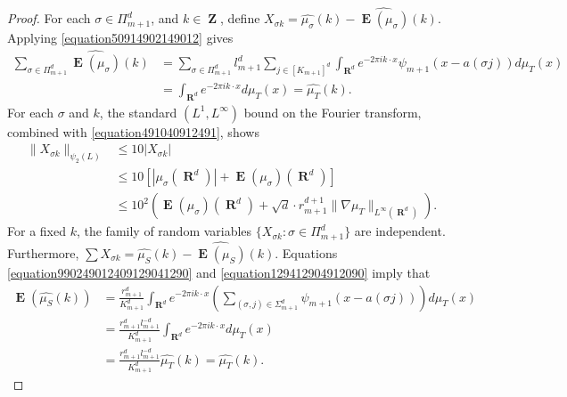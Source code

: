\documentclass[12pt,reqno]{article}
\numberwithin{equation}{section}
\DeclareMathOperator{\RR}{\mathbf{R}}
\DeclareMathOperator{\ZZ}{\mathbf{Z}}
\DeclareMathOperator{\EE}{\mathbf{E}}
\newcommand{\psitwo}[1]{\| {#1} \|_{\psi_2(L)}}
\begin{document}
\begin{proof}
    For each $\sigma \in \Pi_{m+1}^d$, and $k \in \ZZ$, define $X_{\sigma k} = \widehat{\mu_\sigma}(k) - \widehat{\EE(\mu_\sigma)}(k)$. Applying \eqref{equation50914902149012} gives 
    \begin{equation} \label{equation891248921894128942189}
    \begin{split}
        \sum_{\sigma \in \Pi_{m+1}^d} \widehat{\EE(\mu_\sigma)}(k) &= \sum_{\sigma \in \Pi_{m+1}^d} l_{m+1}^d \sum_{j \in [K_{m+1}]^d} \int_{\RR^d} e^{- 2 \pi i k \cdot x} \psi_{m+1}(x - a(\sigma j)) d\mu_T(x)\\
        &= \int_{\RR^d} e^{-2 \pi i k \cdot x} d\mu_T(x) = \widehat{\mu_T}(k).
    \end{split}
    \end{equation}
    For each $\sigma$ and $k$, the standard $(L^1,L^\infty)$ bound on the Fourier transform, combined with \eqref{equation491040912491}, shows
    \begin{equation} \label{equation12904912049012}
    \begin{split}
        \psitwo{X_{\sigma k}} &\leq 10 | X_{\sigma k} |\\
        &\leq 10[| \mu_\sigma(\RR^d) | + \EE(\mu_\sigma)(\RR^d)]\\
        &\leq 10^2 \left( \EE(\mu_\sigma)(\RR^d) + \sqrt{d} \cdot r_{m+1}^{d+1} \| \nabla \mu_T \|_{L^\infty(\RR^d)} \right).
    \end{split}
    \end{equation}
    For a fixed $k$, the family of random variables $\{ X_{\sigma k} : \sigma \in \Pi_{m+1}^d \}$ are independent. Furthermore, $\sum X_{\sigma k} = \widehat{\mu_S}(k) - \widehat{\EE(\mu_S)}(k)$. Equations \eqref{equation990249012409129041290} and \eqref{equation129412904912090} imply that
    \begin{equation} \label{equation19241902490129021}
    \begin{split}
        \EE(\widehat{\mu_S}(k)) &= \frac{r_{m+1}^d}{K_{m+1}^d} \int_{\RR^d} e^{-2 \pi i k \cdot x} \left( \sum_{(\sigma ,j) \in \Sigma_{m+1}^d} \psi_{m+1}(x - a(\sigma j)) \right) d\mu_T(x)\\
        &= \frac{r_{m+1}^d l_{m+1}^{-d}}{K_{m+1}^d} \int_{\RR^d} e^{-2 \pi i k \cdot x} d\mu_T(x)\\
        &= \frac{r_{m+1}^d l_{m+1}^{-d}}{K_{m+1}^d} \widehat{\mu_T}(k) = \widehat{\mu_T}(k).
    \end{split}
    \end{equation}

\end{proof}
\end{document}
